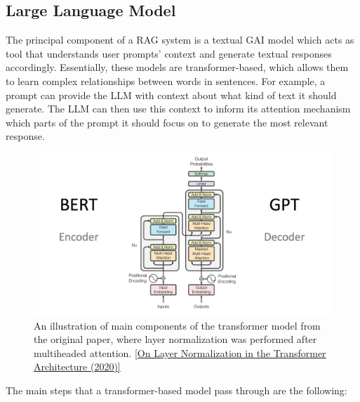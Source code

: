 \subsection{Large Language Model}
The principal component of a RAG system is a textual GAI model which acts as tool that understands user prompts' context and generate textual responses accordingly. Essentially, these models are transformer-based, which allows them to learn complex relationships between words in sentences. For example, a prompt can provide the LLM with context about what kind of text it should generate. The LLM can then use this context to inform its attention mechanism which parts of the prompt it should focus on to generate the most relevant response.
\begin{figure}[htbp]
    \centering
    \includegraphics[width=\linewidth]{./figures/The-Transformer-model-architecture.png}
    \caption{An illustration of main components of the transformer model from the original paper, where layer normalization was performed after multiheaded attention. \href{https://arxiv.org/abs/2002.04745}{[On Layer Normalization in the Transformer Architecture (2020)]}}
\end{figure}\newline
The main steps that a transformer-based model pass through are the following:
